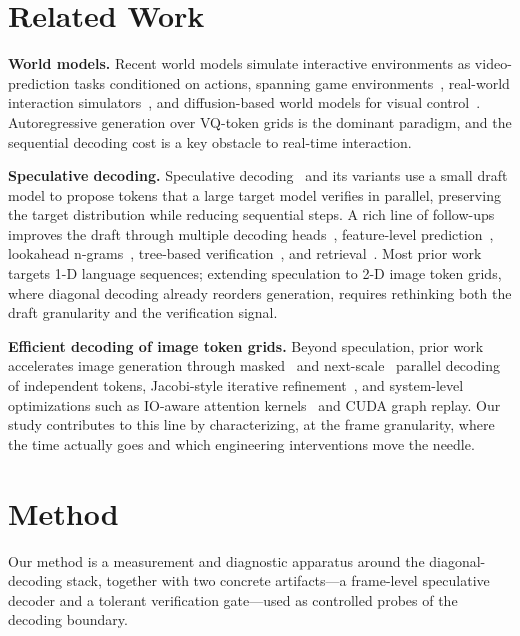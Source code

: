 \documentclass[10pt, twocolumn]{article}
\begin{document}
\section{Related Work}
\label{sec:related}

\textbf{World models.} Recent world models simulate interactive environments as video-prediction tasks conditioned on actions, spanning game environments~\cite{mineworld,genie,gamen}, real-world interaction simulators~\cite{unisim}, and diffusion-based world models for visual control~\cite{diamond,iris}. Autoregressive generation over VQ-token grids is the dominant paradigm, and the sequential decoding cost is a key obstacle to real-time interaction.

\textbf{Speculative decoding.} Speculative decoding~\cite{leviathan2023fast,chen2023accelerating} and its variants use a small draft model to propose tokens that a large target model verifies in parallel, preserving the target distribution while reducing sequential steps. A rich line of follow-ups improves the draft through multiple decoding heads~\cite{medusa}, feature-level prediction~\cite{eagle}, lookahead n-grams~\cite{lookahead}, tree-based verification~\cite{specinfer}, and retrieval~\cite{rest}. Most prior work targets 1-D language sequences; extending speculation to 2-D image token grids, where diagonal decoding already reorders generation, requires rethinking both the draft granularity and the verification signal.

\textbf{Efficient decoding of image token grids.} Beyond speculation, prior work accelerates image generation through masked~\cite{maskgit,muse} and next-scale~\cite{var} parallel decoding of independent tokens, Jacobi-style iterative refinement~\cite{jacobi}, and system-level optimizations such as IO-aware attention kernels~\cite{flashattention,flashattention2} and CUDA graph replay. Our study contributes to this line by characterizing, at the frame granularity, where the time actually goes and which engineering interventions move the needle.

\section{Method}
\label{sec:method}

Our method is a measurement and diagnostic apparatus around the diagonal-decoding stack, together with two concrete artifacts---a frame-level speculative decoder and a tolerant verification gate---used as controlled probes of the decoding boundary.
\end{document}
